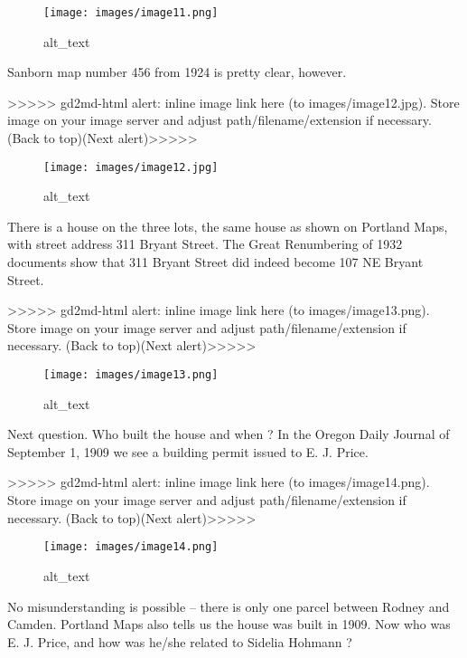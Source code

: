\documentclass[
]{article}
\begin{document}
\begin{figure}
\centering
\texttt{[image: images/image11.png]}
\caption{alt\_text}
\end{figure}

Sanborn map number 456 from 1924 is pretty clear, however.

{\textgreater\textgreater\textgreater\textgreater\textgreater{}
gd2md-html alert: inline image link here (to images/image12.jpg). Store
image on your image server and adjust path/filename/extension if
necessary. }(Back to top)(Next
alert){\textgreater\textgreater\textgreater\textgreater\textgreater{} }

\begin{figure}
\centering
\texttt{[image: images/image12.jpg]}
\caption{alt\_text}
\end{figure}

There is a house on the three lots, the same house as shown on Portland
Maps, with street address 311 Bryant Street. The Great Renumbering of
1932 documents show that 311 Bryant Street did indeed become 107 NE
Bryant Street.

{\textgreater\textgreater\textgreater\textgreater\textgreater{}
gd2md-html alert: inline image link here (to images/image13.png). Store
image on your image server and adjust path/filename/extension if
necessary. }(Back to top)(Next
alert){\textgreater\textgreater\textgreater\textgreater\textgreater{} }

\begin{figure}
\centering
\texttt{[image: images/image13.png]}
\caption{alt\_text}
\end{figure}

Next question. Who built the house and when ? In the Oregon Daily
Journal of September 1, 1909 we see a building permit issued to E. J.
Price.

{\textgreater\textgreater\textgreater\textgreater\textgreater{}
gd2md-html alert: inline image link here (to images/image14.png). Store
image on your image server and adjust path/filename/extension if
necessary. }(Back to top)(Next
alert){\textgreater\textgreater\textgreater\textgreater\textgreater{} }

\begin{figure}
\centering
\texttt{[image: images/image14.png]}
\caption{alt\_text}
\end{figure}

No misunderstanding is possible -- there is only one parcel between
Rodney and Camden. Portland Maps also tells us the house was built in
1909. Now who was E. J. Price, and how was he/she related to Sidelia
Hohmann ?
\end{document}
